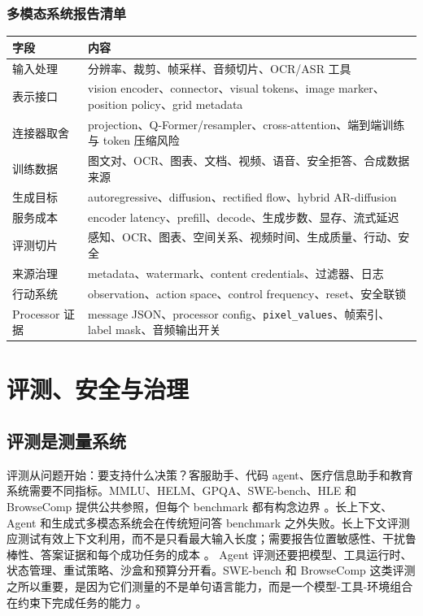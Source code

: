 \documentclass[UTF8,zihao=-4,openany]{ctexbook}
\begin{document}
\subsection{多模态系统报告清单}
\begin{center}
\begin{tabular}{p{}p{}}
\toprule
字段 & 内容 \\
\midrule
输入处理 & 分辨率、裁剪、帧采样、音频切片、OCR/ASR 工具 \\
表示接口 & vision encoder、connector、visual tokens、image marker、position policy、grid metadata \\
连接器取舍 & projection、Q-Former/resampler、cross-attention、端到端训练与 token 压缩风险 \\
训练数据 & 图文对、OCR、图表、文档、视频、语音、安全拒答、合成数据来源 \\
生成目标 & autoregressive、diffusion、rectified flow、hybrid AR-diffusion \\
服务成本 & encoder latency、prefill、decode、生成步数、显存、流式延迟 \\
评测切片 & 感知、OCR、图表、空间关系、视频时间、生成质量、行动、安全 \\
来源治理 & metadata、watermark、content credentials、过滤器、日志 \\
行动系统 & observation、action space、control frequency、reset、安全联锁 \\
Processor 证据 & message JSON、processor config、\texttt{pixel\_values}、帧索引、label mask、音频输出开关 \\
\bottomrule
\end{tabular}
\end{center}

\chapter{评测、安全与治理}
\section{评测是测量系统}
评测从问题开始：要支持什么决策？客服助手、代码 agent、医疗信息助手和教育系统需要不同指标。MMLU、HELM、GPQA、SWE-bench、HLE 和 BrowseComp 提供公共参照，但每个 benchmark 都有构念边界 \cite{hendrycks2020measuring,liang2022holistic,rein2023gpqa,jimenez2023swebench,phan2025humanity,openai2025browsecomp}。长上下文、Agent 和生成式多模态系统会在传统短问答 benchmark 之外失败。长上下文评测应测试有效上下文利用，而不是只看最大输入长度；需要报告位置敏感性、干扰鲁棒性、答案证据和每个成功任务的成本 \cite{zhang2024inftybench,hsieh2024ruler,bai2024longbenchv2}。 Agent 评测还要把模型、工具运行时、状态管理、重试策略、沙盒和预算分开看。SWE-bench 和 BrowseComp 这类评测之所以重要，是因为它们测量的不是单句语言能力，而是一个模型-工具-环境组合在约束下完成任务的能力 \cite{jimenez2023swebench,openai2025browsecomp}。
\end{document}
